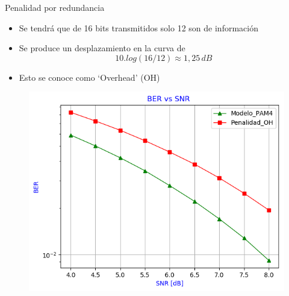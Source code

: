 \documentclass[xcolor=table]{beamer}
\begin{document}
\begin{frame}{Penalidad por redundancia }
\begin{itemize}
    \item Se tendrá que de 16 bits transmitidos solo 12 son de información 
    \item Se produce un desplazamiento en la curva de 
    \begin{equation*}
        10.log(16/12)\approx1,25\, dB
    \end{equation*}
    \item Esto se conoce como `Overhead' (OH)
    \end{itemize}
    \begin{figure}
      \centering
      \includegraphics[width=0.55\paperwidth]{Graficos/BER_vs_SNR_2.png}%
    \end{figure}
\end{frame}
\end{document}
